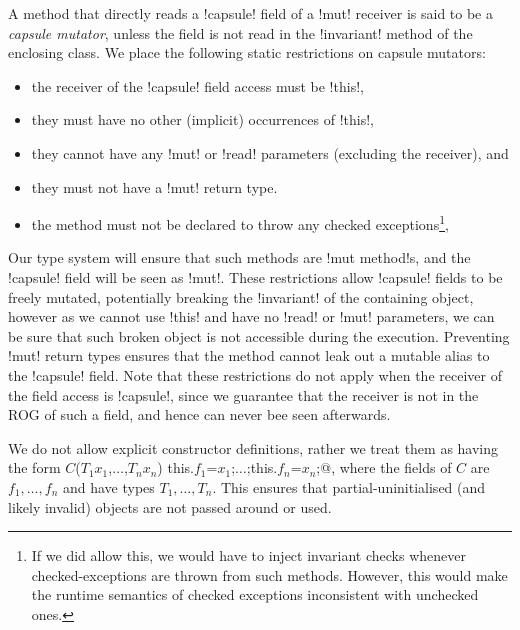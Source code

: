 A method that directly reads a \Q!capsule! field of a \Q!mut! receiver is said to be a \emph{capsule mutator}, unless the field is not read in the \Q!invariant! method of the enclosing class. We place the following static restrictions on capsule mutators:
\begin{itemize}
	\item the receiver of the \Q!capsule! field access must be \Q!this!,
	\item they must have no other (implicit) occurrences of \Q!this!,
	\item they cannot have any \Q!mut! or \Q!read! parameters (excluding the receiver), and
	\item they must not have a \Q!mut! return type.
	\item the method must not be declared to throw any checked exceptions\footnote{If we did allow this, we would have to inject invariant checks whenever checked-exceptions are thrown from such methods. However, this would make the runtime semantics of checked exceptions inconsistent with unchecked ones.},
\end{itemize}
Our type system will ensure that such methods are \Q!mut method!s, and the \Q!capsule! field will be seen as \Q!mut!. These restrictions allow \Q!capsule! fields to be freely mutated, potentially breaking the \Q!invariant! of the containing object, however as we cannot use \Q!this! and have no \Q!read! or \Q!mut! parameters, we can be sure that such broken object is not accessible during the execution. Preventing \Q!mut! return types ensures that the method cannot leak out a mutable alias to the \Q!capsule! field. Note that these restrictions do not apply when the receiver of the field access is \Q!capsule!, since we guarantee that the receiver is not in the ROG of such a field, and hence can never bee seen afterwards.

We do not allow explicit constructor definitions, rather we treat them as having the form \Q@$C$($T_1 x_1$,$\ldots$,$T_n x_n$) {this.$f_1$=$x_1$;$\ldots$;this.$f_n$=$x_n$;}@, where the fields of $C$ are $f_1,\ldots,f_n$ and have types $T_1,\ldots,T_n$. This ensures that partial-uninitialised (and likely invalid) objects are not passed around or used.

